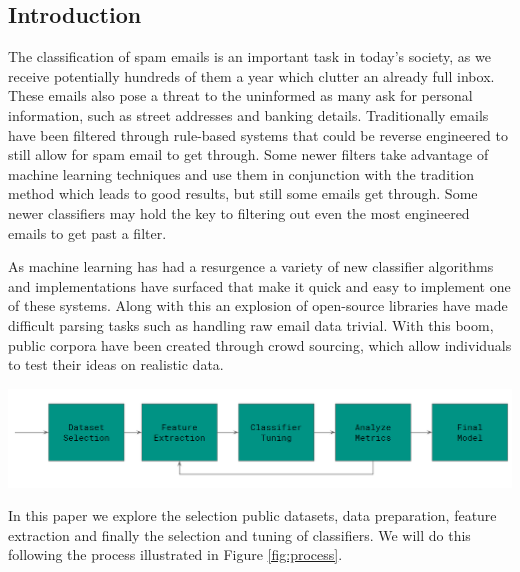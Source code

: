 \documentclass[12pt]{article}
\newenvironment{Figure}
  {\par\medskip\noindent\minipage{\linewidth}}
  {\endminipage\par\medskip}
\begin{document}
    \begin{multicols}{2}
        \section{Introduction}
            The classification of spam emails is an important task in today's society,
            as we receive potentially hundreds of them a year which clutter
            an already full inbox. These emails also pose a threat to the uninformed
            as many ask for personal information, such as street addresses and banking details.
            Traditionally emails have been filtered through rule-based systems that
            could be reverse engineered to still allow for spam email to get through.
            Some newer filters take advantage of machine learning techniques and use
            them in conjunction with the tradition method which leads to good results,
            but still some emails get through. Some newer classifiers may hold the
            key to filtering out even the most engineered emails to get past a filter.
            
            
            As machine learning has had a resurgence a variety
            of new classifier algorithms and implementations have surfaced that 
            make it quick and easy to implement one of these systems. Along with this
            an explosion of open-source libraries have made difficult parsing tasks
            such as handling raw email data trivial. With this boom, public corpora
            have been created through crowd sourcing, which allow individuals to
            test their ideas on realistic data.

            \begin{Figure}
                \centering
                \includegraphics[width=\linewidth]{figures/process.png}
                \label{fig:process}
            \end{Figure}


            In this paper we explore the selection public datasets, data preparation,
            feature extraction and finally the selection and tuning of classifiers.
            We will do this following the process illustrated in Figure \ref{fig:process}.

\end{multicols}
\end{document}
